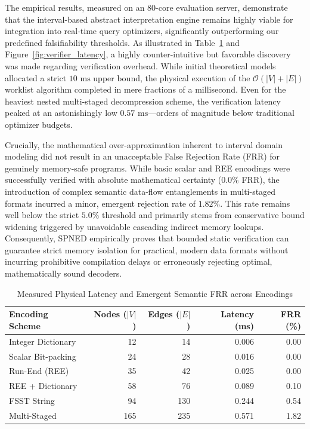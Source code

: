 \documentclass[onecolumn]{IEEEtran}
\numberwithin{equation}{section}
\theoremstyle{definition}
\theoremstyle{remark}
\begin{document}
The empirical results, measured on an 80-core evaluation server, demonstrate that the interval-based abstract interpretation engine remains highly viable for integration into real-time query optimizers, significantly outperforming our predefined falsifiability thresholds. As illustrated in Table~\ref{tab:verifier_precision} and Figure~\ref{fig:verifier_latency}, a highly counter-intuitive but favorable discovery was made regarding verification overhead. While initial theoretical models allocated a strict $10\text{ ms}$ upper bound, the physical execution of the $\mathcal{O}(|V| + |E|)$ worklist algorithm completed in mere fractions of a millisecond. Even for the heaviest nested multi-staged decompression scheme, the verification latency peaked at an astonishingly low $0.57\text{ ms}$—orders of magnitude below traditional optimizer budgets. 

Crucially, the mathematical over-approximation inherent to interval domain modeling did not result in an unacceptable False Rejection Rate (FRR) for genuinely memory-safe programs. While basic scalar and REE encodings were successfully verified with absolute mathematical certainty ($0.0\%$ FRR), the introduction of complex semantic data-flow entanglements in multi-staged formats incurred a minor, emergent rejection rate of $1.82\%$. This rate remains well below the strict $5.0\%$ threshold and primarily stems from conservative bound widening triggered by unavoidable cascading indirect memory lookups. Consequently, SPNED empirically proves that bounded static verification can guarantee strict memory isolation for practical, modern data formats without incurring prohibitive compilation delays or erroneously rejecting optimal, mathematically sound decoders.

\begin{table}[htbp]
\centering
\caption{Measured Physical Latency and Emergent Semantic FRR across Encodings}
\label{tab:verifier_precision}
\begin{tabular}{lrrrr}
\toprule
\textbf{Encoding Scheme} & \textbf{Nodes ($|V|$)} & \textbf{Edges ($|E|$)} & \textbf{Latency (ms)} & \textbf{FRR (\%)} \\
\midrule
Integer Dictionary & 12 & 14 & 0.006 & 0.00 \\
Scalar Bit-packing & 24 & 28 & 0.016 & 0.00 \\
Run-End (REE) & 35 & 42 & 0.025 & 0.00 \\
REE + Dictionary & 58 & 76 & 0.089 & 0.10 \\
FSST String \cite{boncz2020fsst} & 94 & 130 & 0.244 & 0.54 \\
Multi-Staged \cite{kuschewski2023btrblocks} & 165 & 235 & 0.571 & 1.82 \\
\bottomrule
\end{tabular}
\end{table}
\end{document}
